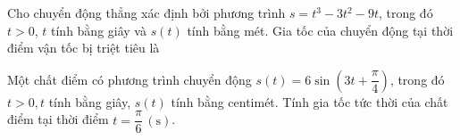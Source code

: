 \begin{bt}
	Cho chuyển động thẳng xác định bởi phương trình $s=t^3-3t^2-9t$, trong đó $t>0$, $t$ tính bằng giây và $s(t)$ tính bằng mét. Gia tốc của chuyển động tại thời điểm vận tốc bị triệt tiêu là
\end{bt}

\begin{bt}%
	Một chất điểm có phương trình chuyển động $s(t)=6 \sin \left(3 t+\dfrac{\pi}{4}\right)$, trong đó $t>0, t$ tính bằng giây, $s(t)$ tính bằng centimét. Tính gia tốc tức thời của chất điểm tại thời điểm $t=\dfrac{\pi}{6}\,(\mathrm{s})$.
\end{bt}
